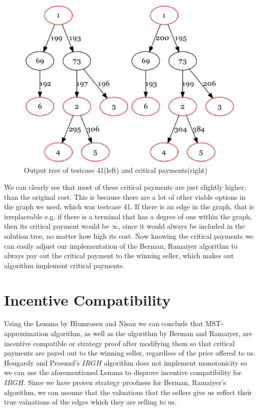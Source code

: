 \begin{figure}[h]
\centering
\includegraphics[scale=0.25]{figures/crit.png}
\caption{Output tree of testcase 41(left) and critical payments(right)}\label{fig:crit41}
\end{figure}
 
We can clearly see that most of these critical payments are just slightly higher, than the original cost. This is because there are a lot of other viable options in the graph we used, which was testcase 41. If there is an edge in the graph, that is irreplaceable e.g. if there is a terminal that has a degree of one within the graph, then its critical payment would be $\infty$, since it would always be included in the solution tree, no matter how high its cost. Now knowing the critical payments we can easily adjust our implementation of the Berman, Ramaiyer algorithm to always pay out the critical payment to the winning seller, which makes out algorithm implement critical payments. 


\section{Incentive Compatibility}

Using the Lemma by Blumrosen and Nisan \cite{BlNi07} we can conclude that MST-approximation algorithm, as well as the algorithm by Berman and Ramaiyer, are incentive compatible or strategy proof after modifying them so that critical payments are payed out to the winning seller, regardless of the price offered to us. Hougardy and Proemel's $IRGH$ algorithm does not implement monotonicity so we can use the aforementioned Lemma to disprove incentive compatibility for $IRGH$. Since we have proven strategy proofness for Berman, Ramaiyer's algorithm, we can assume that the valuations that the sellers give us reflect their true valuations of the edges which they are selling to us. 